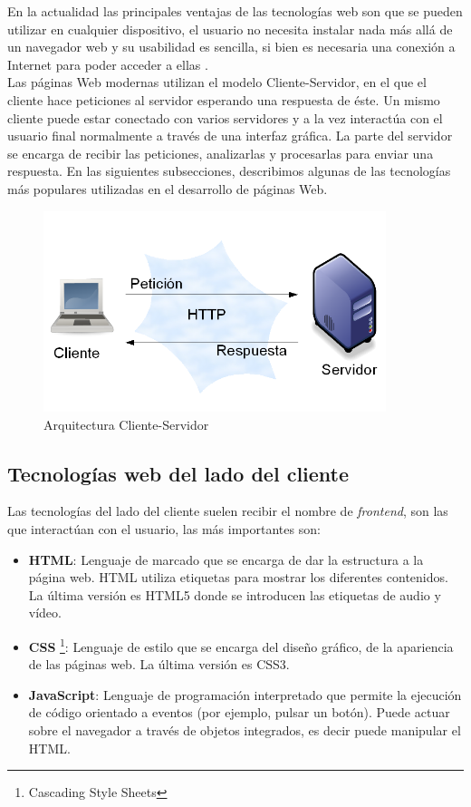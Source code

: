 En la actualidad las principales ventajas de las tecnologías web son que se pueden utilizar en cualquier dispositivo, el usuario no necesita instalar nada más allá de un navegador web y su usabilidad es sencilla, si bien es necesaria una conexión a Internet para poder acceder a ellas \cite{juan}.\\

Las páginas Web modernas utilizan el modelo Cliente-Servidor, en el que el cliente hace peticiones al servidor esperando una respuesta de éste. Un mismo cliente puede estar conectado con varios servidores y a la vez interactúa con el usuario final normalmente a través de una interfaz gráfica. La parte del servidor se encarga de recibir las peticiones, analizarlas y procesarlas para enviar una respuesta. En las siguientes subsecciones, describimos algunas de las tecnologías más populares utilizadas en el desarrollo de páginas Web.

\begin{figure}[H]
    \centering
    \includegraphics[width=10cm, keepaspectratio]{img/arquitectura.png}
    \caption{Arquitectura Cliente-Servidor}
    \label{fig:arquitectura}
\end{figure}

\subsection{Tecnologías web del lado del cliente}
Las tecnologías del lado del cliente suelen recibir el nombre de \textit{frontend}, son las que interactúan con el usuario, las más importantes son:

\begin{itemize}
  \item \textbf{HTML}:  Lenguaje de marcado que se encarga de dar la estructura a la página web. HTML utiliza etiquetas para mostrar los diferentes contenidos. La última versión es HTML5 donde se introducen las etiquetas de audio y vídeo.
  \item \textbf{CSS} \footnote{Cascading Style Sheets}: Lenguaje de estilo que se encarga del diseño gráfico, de la apariencia de las páginas web. La última versión es CSS3.
  \item \textbf{JavaScript}: Lenguaje de programación interpretado que permite la ejecución de código orientado a eventos (por ejemplo, pulsar un botón). Puede actuar sobre el navegador a través de objetos integrados, es decir puede manipular el HTML.
\end{itemize}

